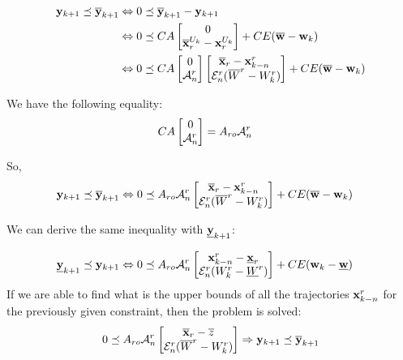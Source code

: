 \documentclass{article}
\begin{document}
\begin{align*}
\mathbf{y}_{k+1} \preceq \overline{\mathbf{y}}_{k+1}
& \Leftrightarrow
0 \preceq \overline{\mathbf{y}}_{k+1} - \mathbf{y}_{k+1} \\
& \Leftrightarrow
0 \preceq
C A \begin{bmatrix} 0 \\ \overline{\mathbf{x}}^{U_k}_r-\mathbf{x}^{U_k}_r \end{bmatrix}
+ C E (\overline{\mathbf{w}} -\mathbf{w}_k)
\\
& \Leftrightarrow
0 \preceq
C A 
\begin{bmatrix} 0 \\ \mathcal{A}^r_n \end{bmatrix} 
\begin{bmatrix}
\overline{\mathbf{x}}_r - \mathbf{x}^r_{k-n}\ \\
\mathcal{E}^r_n (\overline{W}^r - W^r_k)
\end{bmatrix}
+ C E (\overline{\mathbf{w}} -\mathbf{w}_k)
\end{align*}

We have the following equality:
\begin{align*}
C A \begin{bmatrix} 0 \\ \mathcal{A}^r_n \end{bmatrix} 
& = A_{ro} \mathcal{A}^r_n
\end{align*}

So,
\begin{align*}
\mathbf{y}_{k+1} \preceq \overline{\mathbf{y}}_{k+1}
& \Leftrightarrow
0 \preceq
A_{ro} \mathcal{A}^r_n
\begin{bmatrix}
\overline{\mathbf{x}}_r - \mathbf{x}^r_{k-n} \\
\mathcal{E}^r_n (\overline{W}^r - W^r_k)
\end{bmatrix}
+ C E (\overline{\mathbf{w}} -\mathbf{w}_k)
\end{align*}

We can derive the same inequality with $\underline{\mathbf{y}}_{k+1}$:

\begin{align*}
\underline{\mathbf{y}}_{k+1} \preceq \mathbf{y}_{k+1}
& \Leftrightarrow
0 \preceq
A_{ro} \mathcal{A}^r_n
\begin{bmatrix}
\mathbf{x}^r_{k-n} - \underline{\mathbf{x}}_r \\
\mathcal{E}^r_n (W^r_k - \underline{W}^r)
\end{bmatrix}
+ C E (\mathbf{w}_k - \underline{\mathbf{w}})
\end{align*}
If we are able to find what is the upper bounds of all the trajectories $\mathbf{x}^r_{k-n}$ for the previously given constraint, then the problem is solved:
\begin{align*}
0 \preceq
A_{ro} \mathcal{A}^r_n
\begin{bmatrix}
\overline{\mathbf{x}}_r - \overline{z} \\
\mathcal{E}^r_n (\overline{W}^r - W^r_k)
\end{bmatrix}
\Rightarrow
\mathbf{y}_{k+1} \preceq \overline{\mathbf{y}}_{k+1}
\end{align*}
\end{document}

